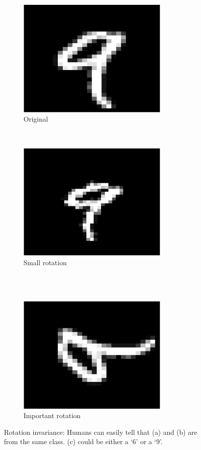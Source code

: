 \documentclass[a4paper,11pt]{report}
\begin{document}
\begin{itemize}
				\begin{figure}[h]
					\centering
					\begin{subfigure}[t]{0.48\textwidth}
						\centering
						\includegraphics[height=2.3in]{im_nine_ori.eps}
						\caption{\centering Original}
					\end{subfigure}%
					~
					\begin{subfigure}[t]{0.48\textwidth}
						\centering
						\includegraphics[height=2.3in]{im_nine_rot15.eps}
						\caption{\centering Small rotation}
					\end{subfigure}%
					\\ 
					~
					\begin{subfigure}[t]{0.48\textwidth}
						\centering
						\includegraphics[height=2.3in]{im_nine_rot90.eps}
						\caption{\centering Important rotation}
					\end{subfigure}
					
					\caption[Rotation invariance.]{\centering Rotation invariance: Humans can easily tell that (a) and (b) are from the same class. (c) could be either a  `6' or a `9'.}
					\label{fig:Illustration rotation invariance}
				\end{figure}
			
			\end{itemize}
			
\end{document}
